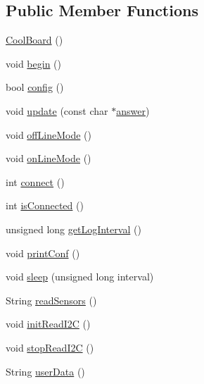 \subsection*{Public Member Functions}
\begin{DoxyCompactItemize}
\item 
\hyperlink{classCoolBoard_a8b88fd781e22e93025dd63474113b7e4}{Cool\+Board} ()
\item 
void \hyperlink{classCoolBoard_acba7c5aef7268b2c0044bdb54d3b9d76}{begin} ()
\item 
bool \hyperlink{classCoolBoard_a583a874c09c07e70a6eb9229fc4beddb}{config} ()
\item 
void \hyperlink{classCoolBoard_a8612756d3f73198cdde857a66f0fe690}{update} (const char $\ast$\hyperlink{classCoolBoard_a7b835fafd449e5282f7f91d787a2dc15}{answer})
\item 
void \hyperlink{classCoolBoard_ae6b5e1274d760462290192acea4adca8}{off\+Line\+Mode} ()
\item 
void \hyperlink{classCoolBoard_aa0bbc4bc605e35618d18e68795c61363}{on\+Line\+Mode} ()
\item 
int \hyperlink{classCoolBoard_a519de78b807f8ec6463ff484eb925918}{connect} ()
\item 
int \hyperlink{classCoolBoard_ad7442cf4b62c7b0d5bd62a0f75ffc065}{is\+Connected} ()
\item 
unsigned long \hyperlink{classCoolBoard_a7508e029f2ee17bb747ffab599285e0d}{get\+Log\+Interval} ()
\item 
void \hyperlink{classCoolBoard_a486507b8f0981d3cc671ed31c2145755}{print\+Conf} ()
\item 
void \hyperlink{classCoolBoard_a069952cdcb2e7f68518aa429eceadb6e}{sleep} (unsigned long interval)
\item 
String \hyperlink{classCoolBoard_ad03abdce2e65f520bbf2cff0f2d083cf}{read\+Sensors} ()
\item 
void \hyperlink{classCoolBoard_a397b46fadab8f530a8cf4d914c561366}{init\+Read\+I2C} ()
\item 
void \hyperlink{classCoolBoard_a8c23a7683ae929ec89d326ae605a41aa}{stop\+Read\+I2C} ()
\item 
String \hyperlink{classCoolBoard_ae7358fb6e623cfc81b775f5f1734909b}{user\+Data} ()
\end{DoxyCompactItemize}
